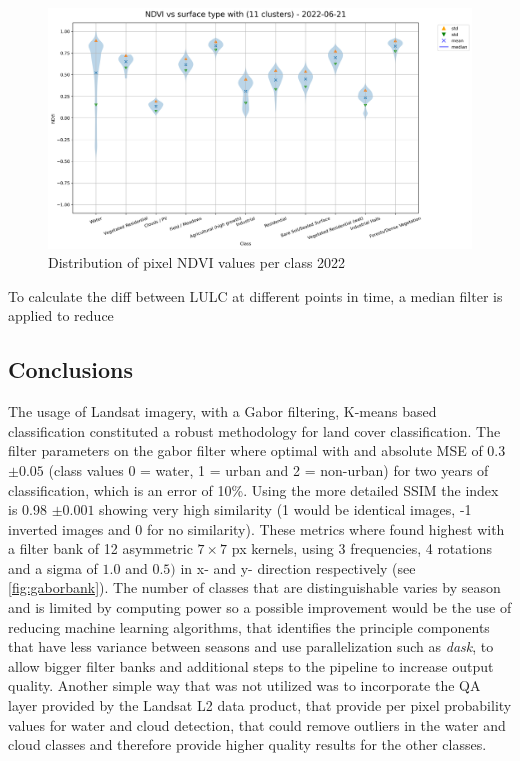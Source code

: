 \documentclass[12pt,a4paper, english,twoside]{scrartcl}
\begin{document}
\begin{landscape}
         \begin{figure}[!p]
           \centering
           \includegraphics[width=0.91\linewidth]{img/NDVI vs surface type with (11 clusters) - 2022-06-21.png}
           \caption{Distribution of pixel \gls{NDVI} values per class 2022\label{fig:ndviclusters2022}}
         \end{figure}
       \end{landscape}
      \noindent
      To calculate the diff between \gls{LULC} at different points in time, a median filter is applied to reduce
      
 \subsection{Conclusions}

    The usage of Landsat imagery, with a Gabor filtering, K-means based classification constituted a robust methodology for land cover classification.
    The filter parameters on the gabor filter where optimal with and absolute MSE of 0.3 $\pm 0.05$ (class values 0 = water, 1 = urban and 2 = non-urban) for two years of classification, which is an error of 10\%.
    Using the more detailed \gls{SSIM} the index is 0.98 $\pm 0.001$ showing very high similarity (1 would be identical images, -1 inverted images and 0 for no similarity). 
    These metrics where found highest with a filter bank of 12 asymmetric $7\times7$ px kernels, using 3 frequencies, 4 rotations and a sigma of $1.0$ and $0.5)$ in x- and y- direction respectively (see \cref{fig:gaborbank}).
    The number of classes that are distinguishable varies by season and is limited by computing power so a possible improvement would be the use of reducing machine learning algorithms, that identifies the principle components that have less variance between seasons and use parallelization such as \textit{dask}\autocite{dask}, to allow bigger filter banks and additional steps to the pipeline to increase output quality.
    Another simple way that was not utilized was to incorporate the QA layer provided by the Landsat L2 data product, that provide per pixel probability values for water and cloud detection, that could remove outliers in the water and cloud classes and therefore provide higher quality results for the other classes. 
    
\end{document}
